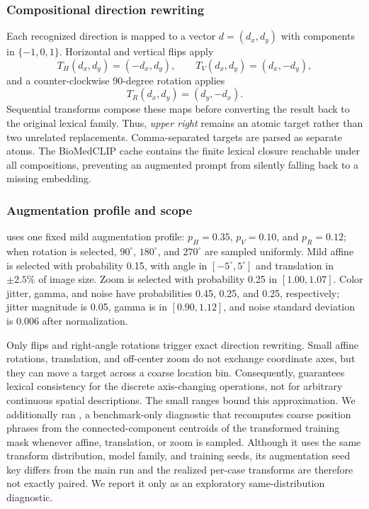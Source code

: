 \subsubsection{Compositional direction rewriting}
Each recognized direction is mapped to a vector $d=(d_x,d_y)$ with components in
$\{-1,0,1\}$. Horizontal and vertical flips apply
\begin{equation}
  T_H(d_x,d_y)=(-d_x,d_y),\qquad
  T_V(d_x,d_y)=(d_x,-d_y),
\end{equation}
and a counter-clockwise 90-degree rotation applies
\begin{equation}
  T_R(d_x,d_y)=(d_y,-d_x).
\end{equation}
Sequential transforms compose these maps before converting the result back to
the original lexical family. Thus, \textit{upper right} remains an atomic target
rather than two unrelated replacements. Comma-separated targets are parsed as
separate atoms. The BioMedCLIP cache contains the finite lexical closure reachable
under all compositions, preventing an augmented prompt from silently falling
back to a missing embedding.

\subsubsection{Augmentation profile and scope}
\methodname{} uses one fixed mild augmentation profile: $p_H=0.35$, $p_V=0.10$, and $p_R=0.12$;
when rotation is selected, $90^\circ$, $180^\circ$, and $270^\circ$ are sampled
uniformly. Mild affine is selected with probability 0.15, with angle in
$[-5^\circ,5^\circ]$ and translation in $\pm2.5\%$ of image size. Zoom is
selected with probability 0.25 in $[1.00,1.07]$. Color jitter, gamma, and noise
have probabilities 0.45, 0.25, and 0.25, respectively; jitter magnitude is 0.05,
gamma is in $[0.90,1.12]$, and noise standard deviation is 0.006 after
normalization.

Only flips and right-angle rotations trigger exact direction rewriting. Small
affine rotations, translation, and off-center zoom do not exchange coordinate
axes, but they can move a target across a coarse location bin. Consequently,
\methodname{} guarantees lexical consistency for the discrete axis-changing
operations, not for arbitrary continuous spatial descriptions. The small ranges
bound this approximation. We additionally ran \locrecompute{}, a benchmark-only
diagnostic that recomputes coarse position phrases from the connected-component
centroids of the transformed training mask whenever affine, translation, or zoom
is sampled. Although it uses the same transform distribution, model family, and
training seeds, its augmentation seed key differs from the main run and the
realized per-case transforms are therefore not exactly paired. We report it only
as an exploratory same-distribution diagnostic.

